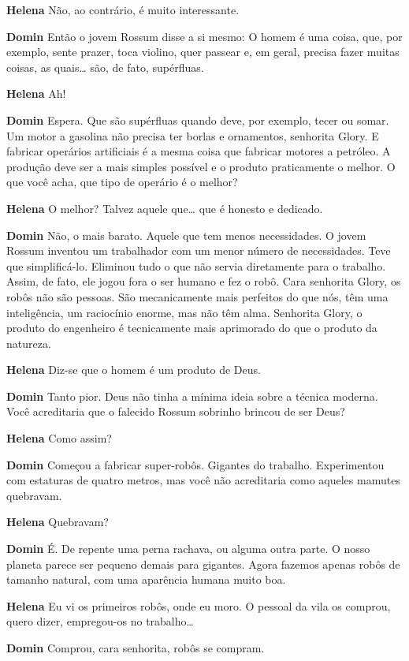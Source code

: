 \textbf{Helena} Não, ao contrário, é muito interessante.

\textbf{Domin} Então o jovem Rossum disse a si mesmo: O homem é uma coisa, que, por
exemplo, sente prazer, toca violino, quer passear e, em geral, precisa fazer
muitas coisas, as quais\ldots{} são, de fato, supérfluas.

\textbf{Helena} Ah!

\textbf{Domin} Espera. Que são supérfluas quando deve, por exemplo, tecer ou somar. Um
motor a gasolina não precisa ter borlas e ornamentos, senhorita Glory. E
fabricar operários artificiais é a mesma coisa que fabricar motores a petróleo.
A produção deve ser a mais simples possível e o produto praticamente o melhor. O
que você acha, que tipo de operário é o melhor?

\textbf{Helena} O melhor? Talvez aquele que\ldots{} que é honesto e dedicado.

\textbf{Domin} Não, o mais barato. Aquele que tem menos necessidades. O jovem Rossum
inventou um trabalhador com um menor número de necessidades. Teve que
simplificá-lo. Eliminou tudo o que não servia diretamente para o trabalho. Assim,
de fato, ele jogou fora o ser humano e fez o robô. Cara senhorita Glory, os
robôs não são pessoas. São mecanicamente mais perfeitos do que nós, têm uma
inteligência, um raciocínio enorme, mas não têm alma. Senhorita Glory, o
produto do engenheiro é tecnicamente mais aprimorado do que o produto da
natureza.

\textbf{Helena} Diz-se que o homem é um produto de Deus.

\textbf{Domin} Tanto pior. Deus não tinha a mínima ideia sobre a técnica moderna. Você
acreditaria que o falecido Rossum sobrinho brincou de ser Deus?

\textbf{Helena} Como assim?

\textbf{Domin} Começou a fabricar super-robôs. Gigantes do trabalho. Experimentou com
estaturas de quatro metros, mas você não acreditaria como aqueles mamutes
quebravam.

\textbf{Helena} Quebravam?

\textbf{Domin} É. De repente uma perna rachava, ou alguma outra parte. O nosso planeta
parece ser pequeno demais para gigantes. Agora fazemos apenas robôs de tamanho
natural, com uma aparência humana muito boa.

\textbf{Helena} Eu vi os primeiros robôs, onde eu moro. O pessoal da vila os comprou,
quero dizer, empregou-os no trabalho\ldots{}

\textbf{Domin} Comprou, cara senhorita, robôs se compram.

